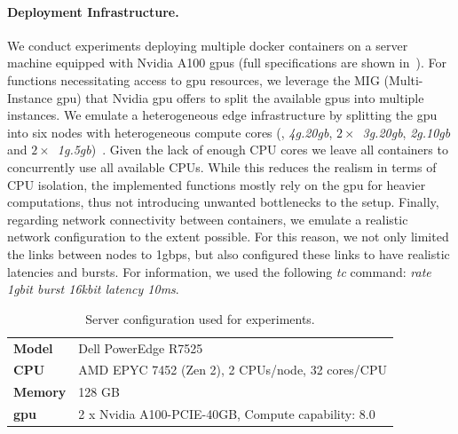 \paragraph{Deployment Infrastructure.} We conduct experiments deploying multiple docker containers on a server machine equipped with Nvidia A100 \acrshort{gpu}s (full specifications are shown in~). For functions necessitating access to \acrshort{gpu} resources, we leverage the MIG (Multi-Instance \acrshort{gpu}) that Nvidia \acrshort{gpu} offers to split the available \acrshort{gpu}s into multiple instances. We emulate a heterogeneous edge infrastructure by splitting the \acrshort{gpu} into six nodes with heterogeneous compute cores (\ie, \textit{4g.20gb}, $2\times$~\textit{3g.20gb}, \textit{2g.10gb} and $2\times$~\textit{1g.5gb})~\cite{nvidiamig}. Given the lack of enough CPU cores we leave all containers to concurrently use all available CPUs. While this reduces the realism in terms of CPU isolation, the implemented functions mostly rely on the \acrshort{gpu} for heavier computations, thus not introducing unwanted bottlenecks to the setup. Finally, regarding network connectivity between containers, we emulate a realistic network configuration to the extent possible. For this reason, we not only limited the links between nodes to 1gbps, but also configured these links to have realistic latencies and bursts. For information, we used the following \textit{tc} command: \textit{rate 1gbit burst 16kbit latency 10ms}.

\begin{table}
	\centering
	\begin{tabular}{p{1cm}p{7cm}}
    \toprule
	\textbf{Model}  & Dell PowerEdge R7525                           			\\
	\textbf{CPU}    & AMD EPYC 7452 (Zen 2), 2 CPUs/node, 32 cores/CPU  	\\
	\textbf{Memory} & 128 GB																							\\
	\textbf{\acrshort{gpu}}    & 2 x Nvidia A100-PCIE-40GB, Compute capability: 8.0	\\
	\bottomrule
	\end{tabular}
	\caption{Server configuration used for experiments.}
	\label{tab:grid5000}
\end{table}

